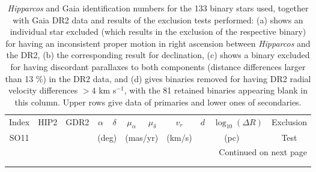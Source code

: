 \documentclass{ws-ijmpd}
\begin{document}
 \tiny
 \begin{landscape}
\begin{longtable}{rrrrrrrrrrl}
\toprule
      Index &    HIP2 & \multicolumn{1}{c}{GDR2} & \multicolumn{1}{c}{$\alpha$} & \multicolumn{1}{c}{$\delta$} & \multicolumn{1}{c}{$\mu_\alpha$} & \multicolumn{1}{c}{$\mu_\delta$} & \multicolumn{1}{c}{$v_r$} & \multicolumn{1}{c}{$d$} & \multicolumn{1}{c}{$\log_{10}(\Delta R)$} & Exclusion\\
 \cmidrule(lr){6-7} \cmidrule(lr){9-10}
\multicolumn{1}{c}{SO11}  &  & & \multicolumn{2}{c}{(deg)} & \multicolumn{2}{c}{(mas/yr)} & \multicolumn{1}{c}{(km/s)} & \multicolumn{2}{c}{(pc)}& \multicolumn{1}{c}{Test} \\
\midrule
\endhead
\midrule
\multicolumn{11}{r}{{Continued on next page}} \\
\midrule
\endfoot


\bottomrule
\\
\caption{ {\it Hipparcos} and Gaia identification numbers for the 133 binary stars used, together with Gaia DR2 data and results of the
      exclusion tests performed: (a) shows an individual star excluded (which results in the exclusion of the respective binary) for
      having an inconsistent proper motion in right ascension between {\it Hipparcos} and the DR2, (b) the corresponding result for
      declination, (c) shows a binary excluded for having discordant parallaxes to both components (distance differences larger than
      13 \%) in the DR2 data, and (d) gives binaries removed for having DR2 radial velocity differences $>4$ km s$^{-1}$, with the
      81 retained binaries appearing blank in this column. Upper rows give data of primaries and lower ones of secondaries.}





\end{longtable}
\end{landscape}
\end{document}
